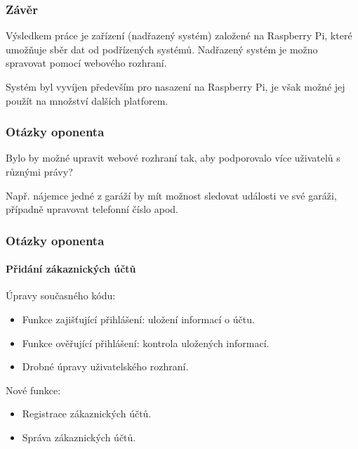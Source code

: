 \documentclass{beamer}
\begin{document}
  \begin{frame}
    \frametitle{Závěr}

    Výsledkem práce je zařízení (nadřazený systém) založené na Raspberry Pi, které umožňuje sběr dat od podřízených systémů. Nadřazený systém je možno spravovat pomocí webového rozhraní.

    \vspace{0.5cm}

    Systém byl vyvíjen především pro nasazení na Raspberry Pi, je však možné jej použít na množství dalších platforem. 

  \end{frame}

  \begin{frame}[noframenumbering]
    \frametitle{Otázky oponenta}

    Bylo by možné upravit webové rozhraní tak, aby podporovalo více uživatelů s různými právy? 

    Např. nájemce jedné z garáží by mít možnost sledovat události ve své garáži, případně upravovat telefonní číslo apod.

  \end{frame}

  \begin{frame}[noframenumbering]
    \frametitle{Otázky oponenta}
    \framesubtitle{Přidání zákaznických účtů}

    Úpravy současného kódu:

    \begin{itemize}
      \item Funkce zajišťující přihlášení: uložení informací o účtu. %
      \item Funkce ověřující přihlášení: kontrola uložených informací.
      \item Drobné úpravy uživatelského rozhraní. %
    \end{itemize}

    Nové funkce:

    \begin{itemize}
      \item Registrace zákaznických účtů. %
      \item Správa zákaznických účtů. %
    \end{itemize}

  \end{frame}
\end{document}
